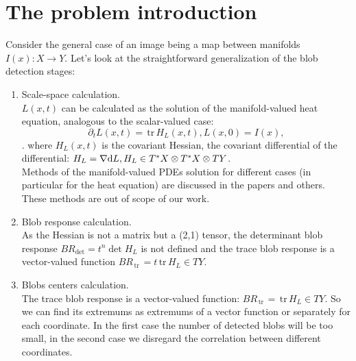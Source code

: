 \documentclass[twocolumn]{svjour3}          %
\newcommand{\partderiv}[2]{\partial_{#2} {#1}}
\newcommand{\CovariantDiff}{\nabla}
\newcommand{\Diff}{\mathrm{d}}
\newcommand{\TangentBundle}[1]{T{#1}}
\newcommand{\CotangentBundle}[1]{\tensor*{T}{^{*}}{#1}}
\newcommand {\tr}{{\,}\mathrm{tr}{\,}}
\begin{document}
\section{The problem introduction}

Consider the general case of an image being a map between manifolds $I(x):X \to Y$.  Let's look at the straightforward generalization of the blob detection stages:
\begin{enumerate}
\item Scale-space calculation. 
\\
$L(x,t)$ can be calculated as the solution of the manifold-valued heat equation, analogous to the scalar-valued case:
\begin{equation}\partderiv{L(x, t)}{t}=\tr H_L(x, t), L(x, 0)=I(x), \end{equation}.
where $H_L(x, t)$ is the covariant Hessian, the covariant differential of the differential: $H_L=\CovariantDiff \Diff L,H_L \in \CotangentBundle{X}\otimes\CotangentBundle{X}\otimes\TangentBundle{Y}$.
\\
Methods of the manifold-valued PDEs solution for different cases (in particular for the heat equation) are discussed in the papers \cite{Harmonic,Kimmel,ManifoldPDEClosest} and others. These methods are out of scope of our work.
\item Blob response calculation. 
\\
As the Hessian is not a matrix but a (2,1) tensor, the determinant blob response $BR_{\det}=t^n \det H_L$ is not defined and the trace blob response is a vector-valued function $BR_{\tr}=t \tr H_L \in \TangentBundle{Y}$. 
\item Blobs centers calculation. 
\\
The trace blob response is a vector-valued function: $BR_{\tr}=\tr{H_L} \in TY$. So we can find its extremums as extremums of a vector function or separately for each coordinate. In the first case the number of detected blobs will be too small, in the second case we disregard the correlation between different coordinates.
\end{enumerate} 
\end{document}
